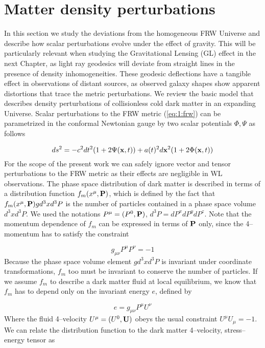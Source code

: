 \section{Matter density perturbations}
\label{sec:1:density-pert}
In this section we study the deviations from the homogeneous FRW Universe and describe how scalar perturbations evolve under the effect of gravity. This will be particularly relevant when studying the Gravitational Lensing (GL) effect in the next Chapter, as light ray geodesics will deviate from straight lines in the presence of density inhomogeneities. These geodesic deflections have a tangible effect in observations of distant sources, as observed galaxy shapes show apparent distortions that trace the metric perturbations. We review the basic model that describes density perturbations of collisionless cold dark matter in an expanding Universe. Scalar perturbations to the FRW metric (\ref{eq:1:frw}) can be parametrized in the conformal Newtonian gauge \citep{Dodelson-C4} by two scalar potentials $\Phi,\Psi$ as follows

\begin{equation}
\label{eq:1:confnewt}
ds^2 = -c^2dt^2(1+2\Psi(\mathbf{x},t)) + a(t)^2d\mathbf{x}^2(1+2\Phi(\mathbf{x},t))
\end{equation}
%
For the scope of the present work we can safely ignore vector and tensor perturbations to the FRW metric as their effects are negligible in WL observations. The phase space distribution of dark matter is described in terms of a distribution function $f_m(x^\mu,\mathbf{P})$, which is defined by the fact that $f_m(x^\mu,\mathbf{P})g d^3x d^3P$ is the number of particles contained in a phase space volume $d^3x d^3P$. We used the notations $P^\mu=(P^0,\mathbf{P})$, $d^3 P = dP^x dP^y dP^z$. Note that the momentum dependence of $f_m$ can be expressed in terms of $\mathbf{P}$ only, since the 4--momentum has to satisfy the constraint

\begin{equation}
\label{eq:1:m-constraint}
g_{\mu\nu}P^\mu P^\nu = -1
\end{equation} 
%
Because the phase space volume element $g d^3x d^3P$ is invariant under coordinate transformations, $f_m$ too must be invariant to conserve the number of particles. If we assume $f_m$ to describe a dark matter fluid at local equilibrium, we know that $f_m$ has to depend only on the invariant energy $e$, defined by \citep{JuttnerCov}

\begin{equation}
\label{eq:1:invariant-e}
e = g_{\mu\nu}P^\mu U^\nu
\end{equation}
%
Where the fluid 4--velocity $U^\mu = (U^0,\mathbf{U})$ obeys the usual constraint $U^\mu U_\mu=-1$. We can relate the distribution function to the dark matter 4--velocity, stress--energy tensor \citep{JuttnerCov} as

